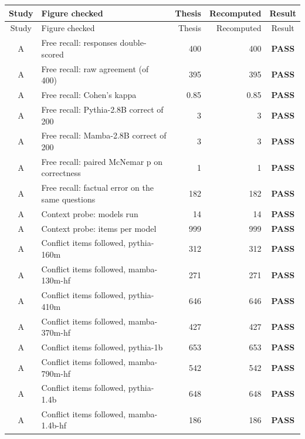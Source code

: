 {\small
\setlength{\tabcolsep}{4pt}
\begin{longtable}{@{}cp{8.2cm}rrc@{}}
\toprule
Study & Figure checked & Thesis & Recomputed & Result\\
\midrule
\endfirsthead
\toprule
Study & Figure checked & Thesis & Recomputed & Result\\
\midrule
\endhead
A & Free recall: responses double-scored & 400 & 400 & \textcolor{okgreen}{\textbf{PASS}} \\
A & Free recall: raw agreement (of 400) & 395 & 395 & \textcolor{okgreen}{\textbf{PASS}} \\
A & Free recall: Cohen's kappa & 0.85 & 0.85 & \textcolor{okgreen}{\textbf{PASS}} \\
A & Free recall: Pythia-2.8B correct of 200 & 3 & 3 & \textcolor{okgreen}{\textbf{PASS}} \\
A & Free recall: Mamba-2.8B correct of 200 & 3 & 3 & \textcolor{okgreen}{\textbf{PASS}} \\
A & Free recall: paired McNemar p on correctness & 1 & 1 & \textcolor{okgreen}{\textbf{PASS}} \\
A & Free recall: factual error on the same questions & 182 & 182 & \textcolor{okgreen}{\textbf{PASS}} \\
A & Context probe: models run & 14 & 14 & \textcolor{okgreen}{\textbf{PASS}} \\
A & Context probe: items per model & 999 & 999 & \textcolor{okgreen}{\textbf{PASS}} \\
A & Conflict items followed, pythia-160m & 312 & 312 & \textcolor{okgreen}{\textbf{PASS}} \\
A & Conflict items followed, mamba-130m-hf & 271 & 271 & \textcolor{okgreen}{\textbf{PASS}} \\
A & Conflict items followed, pythia-410m & 646 & 646 & \textcolor{okgreen}{\textbf{PASS}} \\
A & Conflict items followed, mamba-370m-hf & 427 & 427 & \textcolor{okgreen}{\textbf{PASS}} \\
A & Conflict items followed, pythia-1b & 653 & 653 & \textcolor{okgreen}{\textbf{PASS}} \\
A & Conflict items followed, mamba-790m-hf & 542 & 542 & \textcolor{okgreen}{\textbf{PASS}} \\
A & Conflict items followed, pythia-1.4b & 648 & 648 & \textcolor{okgreen}{\textbf{PASS}} \\
A & Conflict items followed, mamba-1.4b-hf & 186 & 186 & \textcolor{okgreen}{\textbf{PASS}} \\

\end{longtable}}
